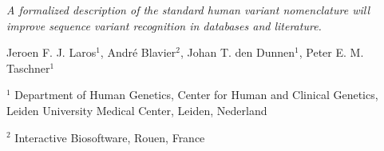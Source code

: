 \emph{
  A formalized description of the standard human variant nomenclature will
  improve sequence variant recognition in databases and literature.
}
\vspace{0.1cm}

{\scriptsize
  Jeroen F. J. Laros$^1$, Andr\'e Blavier$^2$, Johan T. den Dunnen$^1$,
  Peter E. M. Taschner$^1$
}
\vspace{0.1cm}

{\tiny
  $^1$ Department of Human Genetics, Center for Human and Clinical Genetics,
  Leiden University Medical Center, Leiden, Nederland
  \vspace{-0.2cm}

  $^2$ Interactive Biosoftware, Rouen, France
}
